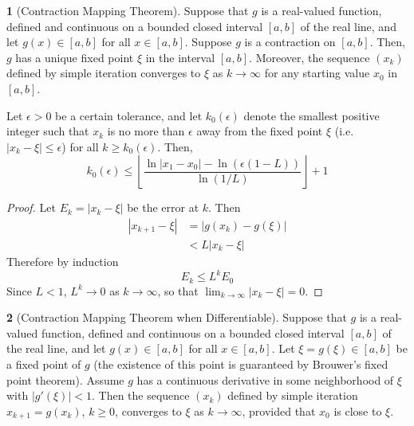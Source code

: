 \documentclass[12pt]{article}
\theoremstyle{definition}
\newtheorem{theorem}{\color{ForestGreen}{\textbf{Theorem}}}
\theoremstyle{definition}
\begin{document}
\begin{theorem}[Contraction Mapping Theorem]
Suppose that $g$ is a real-valued function, defined and continuous on a bounded closed interval $[a,b]$ of the real line, and let $g(x) \in [a,b]$ for all $x \in [a,b]$. Suppose $g$ is a contraction on $[a,b]$. Then, $g$ has a unique fixed point $\xi$ in the interval $[a,b]$. Moreover, the sequence $(x_k)$ defined by simple iteration converges to $\xi$ as $k \to \infty$ for any starting value $x_0$ in $[a,b]$. 

Let $\epsilon > 0$ be a certain tolerance, and let $k_0 (\epsilon)$ denote the smallest positive integer such that $x_k$ is no more than $\epsilon$ away from the fixed point $\xi$ (i.e. $|x_k - \xi| \leq \epsilon$) for all $k \geq k_0 (\epsilon)$. Then,
\begin{equation}
k_0 (\epsilon) \leq \left\lfloor \frac{\ln|x_1 - x_0| - \ln(\epsilon (1 - L))}{\ln (1 / L)}\right\rfloor + 1
\end{equation}
\end{theorem}

\begin{proof}
Let $E_k = |x_k - \xi|$ be the error at $k$. Then 
\begin{align*}
|x_{k+1} - \xi| &= |g(x_k) - g(\xi)| \tag{definition of $g$ and $\xi$ a fixed point}\\
&< L |x_k - \xi| \tag{$g$ a contraction}
\end{align*}
Therefore by induction
\begin{equation}
	E_{k} \leq L^k E_0
\end{equation}
Since $L < 1$, $L^k \to 0$ as $k \to \infty$, so that $\lim_{k \to \infty} |x_k - \xi| = 0$. 
\end{proof}

\begin{theorem}[Contraction Mapping Theorem when Differentiable]
Suppose that $g$ is a real-valued function, defined and continuous on a bounded closed interval $[a,b]$ of the real line, and let $g(x) \in [a,b]$ for all $x \in [a,b]$. Let $\xi= g(\xi) \in [a,b]$ be a fixed point of $g$ (the existence of this point is guaranteed by Brouwer's fixed point theorem). Assume $g$ has a continuous derivative in some neighborhood of $\xi$ with $|g'(\xi)| < 1$. Then the sequence $(x_k)$ defined by simple iteration $x_{k+1} = g(x_k)$, $k \geq 0$, converges to $\xi$ as $k \to \infty$, provided that $x_0$ is close to $\xi$. 
\end{theorem}
\end{document}
